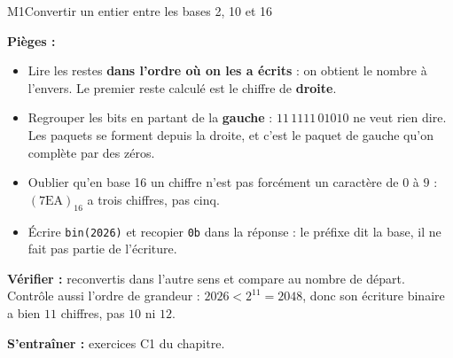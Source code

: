 \begin{fichemethode}{M1}{Convertir un entier entre les bases 2, 10 et 16}

\textbf{Pièges :}
\begin{itemize}
  \item Lire les restes \textbf{dans l'ordre où on les a écrits} : on obtient le nombre à
    l'envers. Le premier reste calculé est le chiffre de \textbf{droite}.
  \item Regrouper les bits en partant de la \textbf{gauche} : $11\,1111\,01010$ ne veut rien
    dire. Les paquets se forment depuis la droite, et c'est le paquet de gauche qu'on
    complète par des zéros.
  \item Oublier qu'en base 16 un chiffre n'est pas forcément un caractère de $0$ à $9$ :
    $(\text{7EA})_{16}$ a trois chiffres, pas cinq.
  \item Écrire \lstinline{bin(2026)} et recopier \lstinline{0b} dans la réponse : le préfixe
    dit la base, il ne fait pas partie de l'écriture.
\end{itemize}

\textbf{Vérifier :} reconvertis dans l'autre sens et compare au nombre de départ. Contrôle
aussi l'ordre de grandeur : $2026 < 2^{11} = 2048$, donc son écriture binaire a bien $11$
chiffres, pas $10$ ni $12$.

\textbf{S'entraîner :} exercices C1 du chapitre.
\end{fichemethode}
